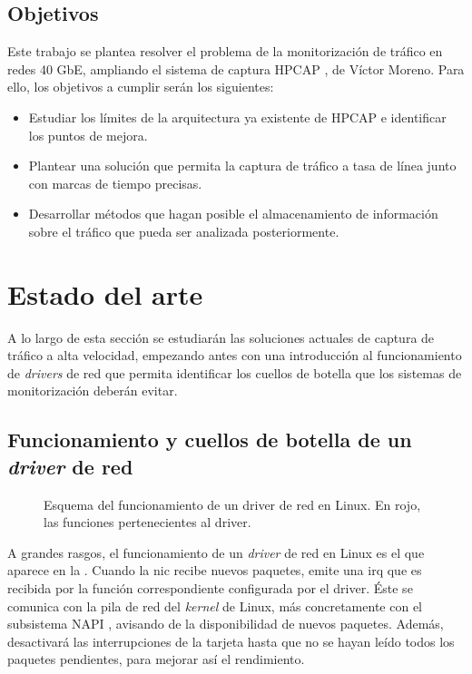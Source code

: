 \documentclass[oneside, draft]{epstfg}
\begin{document}
\section{Objetivos}

Este trabajo se plantea resolver el problema de la monitorización de tráfico en redes 40 GbE, ampliando el sistema de captura HPCAP \cite{victorPhD}, de Víctor Moreno. Para ello, los objetivos a cumplir serán los siguientes:

\begin{itemize}[itemsep=0pt]
\item Estudiar los límites de la arquitectura ya existente de HPCAP e identificar los puntos de mejora.
\item Plantear una solución que permita la captura de tráfico a tasa de línea junto con marcas de tiempo precisas.
\item Desarrollar métodos que hagan posible el almacenamiento de información sobre el tráfico que pueda ser analizada posteriormente.
\end{itemize}

\chapter{Estado del arte}

A lo largo de esta sección se estudiarán las soluciones actuales de captura de tráfico a alta velocidad, empezando antes con una introducción al funcionamiento de \textit{drivers} de red que permita identificar los cuellos de botella que los sistemas de monitorización deberán evitar.

\section{Funcionamiento y cuellos de botella de un \textit{driver} de red}
\label{sec:EstadoArte:Funcionamiento}

\begin{figure}[hbtp]
\centering

\caption[Funcionamiento de un \textit{driver} de red en Linux]{Esquema del funcionamiento de un \gls{driver} de red en Linux. En rojo, las funciones pertenecientes al \gls{driver}.}
\label{fig:LinuxNetworkStack}
\end{figure}

A grandes rasgos, el funcionamiento de un \textit{\gls{driver}} de red en Linux es el que aparece en la . Cuando la \gls{nic} recibe nuevos paquetes, emite una \gls{irq} que es recibida por la función correspondiente configurada por el \gls{driver}. Éste se comunica con la pila de red del \textit{kernel} de Linux, más concretamente con el subsistema \gls{NAPI} \cite{NAPI}, avisando de la disponibilidad de nuevos paquetes. Además, desactivará las interrupciones de la tarjeta hasta que no se hayan leído todos los paquetes pendientes, para mejorar así el rendimiento.
\end{document}
